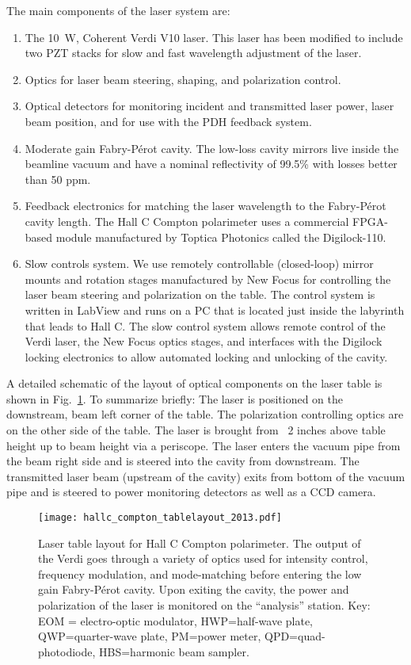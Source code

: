 {The main components of the laser system are:
\begin{enumerate}
 \item{The 10~W, Coherent Verdi V10 laser. This laser has been modified to include two PZT stacks for slow and
 fast wavelength adjustment of the laser.}
 \item{Optics for laser beam steering, shaping, and polarization control.}
 \item{Optical detectors for monitoring incident and transmitted laser power, laser beam position, and for
 use with the PDH feedback system.}
 \item{Moderate gain Fabry-P\'{e}rot cavity. The low-loss cavity mirrors live inside the beamline vacuum and
 have a nominal reflectivity of 99.5\% with losses better than 50 ppm.}
 \item{Feedback electronics for matching the laser wavelength to the Fabry-P\'{e}rot cavity length. The
 Hall C Compton polarimeter uses a commercial FPGA-based module manufactured by Toptica Photonics called the
 Digilock-110.}
 \item{Slow controls system. We use remotely controllable (closed-loop) mirror mounts and rotation stages
 manufactured by New Focus for controlling the laser beam steering and polarization on the table. The control
 system is written in LabView and runs on a PC that is located just inside the labyrinth that leads to Hall C.
 The slow control system allows remote control of the Verdi laser, the New Focus optics stages, and interfaces
 with the Digilock locking electronics to allow automated locking and unlocking of the cavity.}
 \end{enumerate}

A detailed schematic of the layout of optical components on the laser table is shown in
Fig.~\ref{fig:laser_table}.  To summarize briefly: The laser is positioned on the downstream, beam left
corner of the table. The polarization controlling optics are on the other side of the table. The laser
is brought from ~2 inches above table height up to beam height via a periscope. The laser enters the vacuum
pipe from the beam right side and is steered into the cavity from downstream. The transmitted laser beam
(upstream of the cavity) exits from bottom of the vacuum pipe and is steered to power monitoring detectors
as well as a CCD camera.


\begin{figure}[htp]
\begin{center}
\texttt{[image: hallc\_compton\_tablelayout\_2013.pdf]}
\caption{Laser table layout for Hall C Compton polarimeter. The output of the Verdi goes through a
variety of optics used for intensity control, frequency modulation, and mode-matching before
entering the low gain Fabry-P\'{e}rot cavity. Upon exiting the cavity, the power and polarization of the
laser is monitored on the “analysis” station. Key: EOM = electro-optic modulator, HWP=half-wave plate,
QWP=quarter-wave plate, PM=power meter, QPD=quad-photodiode, HBS=harmonic beam sampler.
\label{fig:laser_table}}
\end{center}
\end{figure}

}
